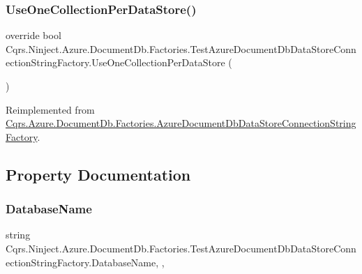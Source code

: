 \subsubsection{\texorpdfstring{Use\+One\+Collection\+Per\+Data\+Store()}{UseOneCollectionPerDataStore()}}
{\footnotesize\ttfamily override bool Cqrs.\+Ninject.\+Azure.\+Document\+Db.\+Factories.\+Test\+Azure\+Document\+Db\+Data\+Store\+Connection\+String\+Factory.\+Use\+One\+Collection\+Per\+Data\+Store (\begin{DoxyParamCaption}{ }\end{DoxyParamCaption})\hspace{0.3cm}{\ttfamily [virtual]}}



Reimplemented from \hyperlink{classCqrs_1_1Azure_1_1DocumentDb_1_1Factories_1_1AzureDocumentDbDataStoreConnectionStringFactory_a736e0967785b1391ec21989a3f005c01}{Cqrs.\+Azure.\+Document\+Db.\+Factories.\+Azure\+Document\+Db\+Data\+Store\+Connection\+String\+Factory}.



\subsection{Property Documentation}
\mbox{\label{classCqrs_1_1Ninject_1_1Azure_1_1DocumentDb_1_1Factories_1_1TestAzureDocumentDbDataStoreConnectionStringFactory_ae0da37bd91333ad782058d32d4de2594}} 
\subsubsection{\texorpdfstring{Database\+Name}{DatabaseName}}
{\footnotesize\ttfamily string Cqrs.\+Ninject.\+Azure.\+Document\+Db.\+Factories.\+Test\+Azure\+Document\+Db\+Data\+Store\+Connection\+String\+Factory.\+Database\+Name\hspace{0.3cm}{\ttfamily [static]}, {\ttfamily [get]}, {\ttfamily [set]}}

